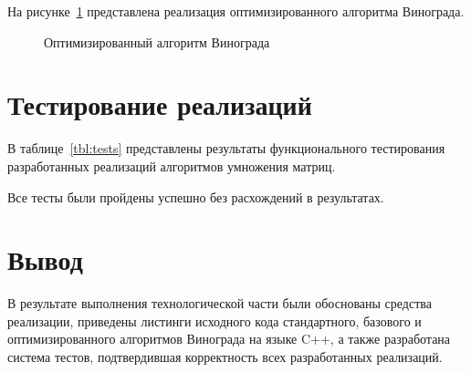 На рисунке~\ref{fig:winograd_opt_mult} представлена реализация оптимизированного алгоритма Винограда.
\begin{figure}[H]
    \centering
    
    \caption{Оптимизированный алгоритм Винограда}
    \label{fig:winograd_opt_mult}
\end{figure}

\section{Тестирование реализаций}

В таблице~\ref{tbl:tests} представлены результаты функционального тестирования разработанных реализаций алгоритмов умножения матриц.



Все тесты были пройдены успешно без расхождений в результатах.

\section{Вывод}

В результате выполнения технологической части были обоснованы средства реализации, приведены листинги исходного кода стандартного, базового и оптимизированного алгоритмов Винограда на языке C++, а также разработана система тестов, подтвердившая корректность всех разработанных реализаций.